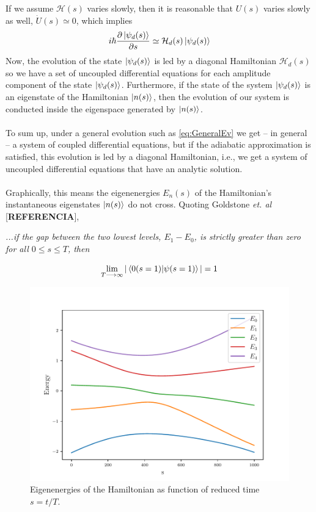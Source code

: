 If we assume $\mathcal{H}(s)$ varies slowly, then it is reasonable that $U(s)$ varies slowly as well, $\dot{U}(s) \simeq 0$, which implies
\begin{equation}
    i\hbar  \frac{\partial \ket{\psi_{d}(s)}}{\partial s} \simeq \mathcal{H}_{d}(s)\ket{\psi_{d}(s)}
\end{equation}
Now, the evolution of the state $\ket{\psi_{d}(s)}$ is led by a diagonal Hamiltonian $\mathcal{H}_{d}(s)$ so we have a set of uncoupled differential equations for each amplitude component of the state $\ket{\psi_{d}(s)}$. Furthermore, if the state of the system $\ket{\psi_{d}(s)}$ is an eigenstate of the Hamiltonian $\ket{n(s)}$, then the evolution of our system is conducted inside the eigenspace generated by $\ket{n(s)}$.\\\\
To sum up, under a general evolution such as \ref{eq:GeneralEv} we get -- in general -- a system of coupled differential equations, but if the adiabatic approximation is satisfied, this evolution is led by a diagonal Hamiltonian, i.e., we get a system of uncoupled differential equations that have an analytic solution.\\\\
Graphically, this means the eigenenergies $E_{n}(s)$ of the Hamiltonian's instantaneous eigenstates $\ket{n(s)}$ do not cross.
Quoting Goldstone \textit{et. al} [\textbf{REFERENCIA}],
\begin{displayquote}
\textit{...if the gap between the two lowest levels, $E_{1} - E_{0}$, is strictly greater than zero for all $0 \leq s \leq T$, then}
\end{displayquote}
\begin{equation}
    \lim_{T\longrightarrow \infty} | \braket{0(s=1) | \psi(s=1)}| = 1
\end{equation}
\begin{figure}[H]
    \centering
    \includegraphics[width=\textwidth]{Figures/Eigenenergies.pdf}
    \caption{Eigenenergies of the Hamiltonian as function of reduced time $s=t/T$.}
    \label{fig:Eigenenergies}
\end{figure}
